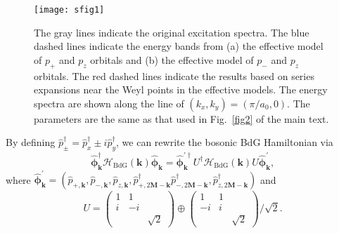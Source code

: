 \documentclass[aps,pra,floatfix,twocolumn,superscriptaddress]{revtex4-1}
\begin{document}
\begin{figure}[tbp]
	\centering
	\texttt{[image: sfig1]}
	\caption{The gray lines indicate the original excitation spectra. The blue dashed lines indicate the energy bands from (a) the effective model of $p_+$ and $p_z$ orbitals and (b) the effective model of $p_-$ and $p_z$ orbitals. The red dashed lines indicate the results based on series expansions near the Weyl points in the effective models. The energy spectra are shown along the line of $(k_x,k_y)=(\pi/a_0,0)$. The parameters are the same as that used in Fig.~\ref{fig2} of the main text.}
	\label{sfig1}
\end{figure}
By defining $\hat{p}_{\pm}^\dagger=\hat{p}_x^\dagger\pm i \hat{p}_y^\dagger$, we can rewrite the bosonic BdG Hamiltonian via
\begin{equation}
	\hat{\bm{\phi}}_\mathbf{k}^\dagger
	\mathcal{H}_{\mathrm{BdG}}(\mathbf{k})
	\hat{\bm{\phi}}_\mathbf{k}=\hat{\bm{\phi}}_\mathbf{k}^{\prime\dagger}
	U^\dagger \mathcal{H}_{\mathrm{BdG}} (\mathbf{k}) U
	\hat{\bm{\phi}}_\mathbf{k}^\prime,
\end{equation}
where
$\hat{\bm{\phi}}_\mathbf{k}^\prime=(\hat{p}_{+,\mathbf{k}},\hat{p}_{-,\mathbf{k}},\hat{p}_{z,\mathbf{k}},\hat{p}_{+,2\mathbf{M}-\mathbf{k}}^\dagger\hat{p}_{-,2\mathbf{M}-\mathbf{k}}^\dagger,\hat{p}_{z,2\mathbf{M}-\mathbf{k}}^\dagger)$ and
\begin{equation}
	U=\left(\begin{array}{ccc}
		1 & 1\\
		i & -i\\
		&  & \sqrt{2}
	\end{array}\right)\oplus\left(\begin{array}{ccc}
		1 & 1\\
		-i & i\\
		&  & \sqrt{2}
	\end{array}\right)/\sqrt{2}.
\end{equation}
\end{document}
